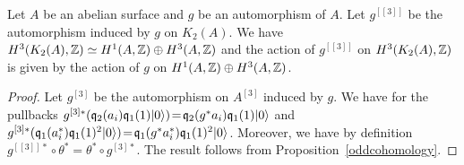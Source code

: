 \begin{cor}\label{actionH3}
Let $A$ be an abelian surface and $g$ be an automorphism of $A$. Let $g^{[[3]]}$ be the automorphism induced by $g$ on $K_2(A)$.
We have $H^3(K_2(A),\mathbb{Z})\simeq H^1(A,\mathbb{Z})\oplus H^3(A,\mathbb{Z})$ and the action of $g^{[[3]]}$ on $H^3(K_2(A),\mathbb{Z})$ is given by the action of $g$ on $H^1(A,\mathbb{Z})\oplus H^3(A,\mathbb{Z})$.
\end{cor}
\begin{proof}
Let $g^{[3]}$ be the automorphism on $A^{[3]}$ induced by $g$.
We have for the pullbacks $g^{[3]*}(\mathfrak{q}_2(a_i)\mathfrak{q}_1(1)|0\rangle)\!=\!\mathfrak{q}_2(g^{*}a_i)\mathfrak{q}_1(1)|0\rangle$ and $g^{[3]*}(\mathfrak{q}_1(a^*_i)\mathfrak{q}_1(1)^2|0\rangle)\!=\!\mathfrak{q}_1(g^{*}a^*_i)\mathfrak{q}_1(1)^2|0\rangle$.
Moreover, we have by definition $g^{[[3]]*}\circ \theta^{*}=\theta^{*}\circ g^{[3]*}$.
The result follows from Proposition~\ref{oddcohomology}.
\end{proof}
